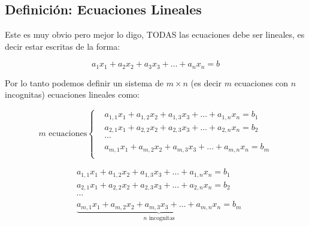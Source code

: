 \documentclass[12pt]{report}                                    %
\begin{document}
            \subsection{Definición: Ecuaciones Lineales}

                Este es muy obvio pero mejor lo digo, TODAS las ecuaciones debe ser lineales,
                es decir estar escritas de la forma:

                \begin{equation}
                    a_1x_1 + a_2x_2 + a_3x_3 + \dots + a_nx_n = b
                \end{equation}


                Por lo tanto podemos definir un sistema de $m \times n$ (es decir $m$ ecuaciones
                con $n$ incognitas) ecuaciones lineales como:

                \begin{equation*}
                    m \text{ ecuaciones}
                    \begin{cases}
                        & a_{1,1}x_1 + a_{1,2}x_2 + a_{1,3}x_3 + \dots + a_{1,n}x_n = b_1 \\
                        & a_{2,1}x_1 + a_{2,2}x_2 + a_{2,3}x_3 + \dots + a_{2,n}x_n = b_2 \\
                        & \cdots \\
                        & a_{m,1}x_1 + a_{m,2}x_2 + a_{m,3}x_3 + \dots + a_{m,n}x_n = b_m \\
                    \end{cases}      
                \end{equation*}

                \begin{equation*}
                    \begin{split}
                        &a_{1,1}x_1 + a_{1,2}x_2 + a_{1,3}x_3 + \dots + a_{1,n}x_n = b_1 \\
                        &a_{2,1}x_1 + a_{2,2}x_2 + a_{2,3}x_3 + \dots + a_{2,n}x_n = b_2 \\
                        &\cdots \\
                        &\underbrace{a_{m,1}x_1 + a_{m,2}x_2 + a_{m,3}x_3 + \dots + a_{m,n}x_n = b_m}_\text{$n$ incognitas}
                    \end{split}
                \end{equation*}
\end{document}
